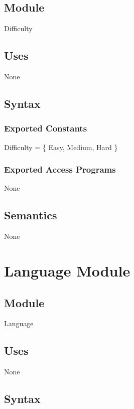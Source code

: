 \documentclass[12pt, titlepage]{article}
\begin{document}
\subsection{Module}

Difficulty

\subsection{Uses}

None


\subsection{Syntax}

\subsubsection{Exported Constants}

Difficulty = \{
    Easy,
    Medium,
    Hard
\}

\subsubsection{Exported Access Programs}
None


\subsection{Semantics}

None



\newpage

\section{Language Module} \label{Language} 

\subsection{Module}

Language

\subsection{Uses}

None


\subsection{Syntax}
\end{document}
